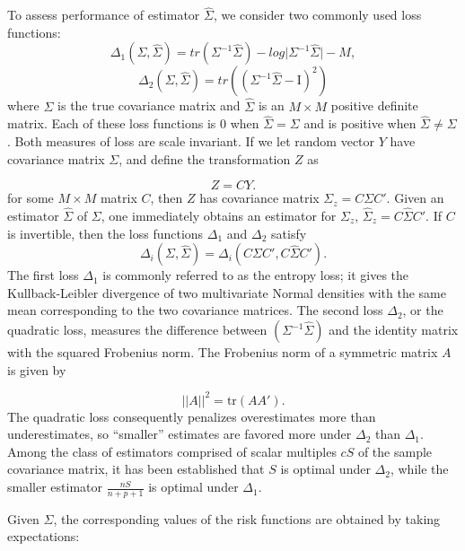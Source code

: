 \documentclass[12pt]{article}
\theoremstyle{definition}
\begin{document}
To assess performance of estimator $\hat{\Sigma}$, we consider two commonly used loss functions:
\begin{equation} \label{eq:quad-loss}
\Delta_1\left(\Sigma,\hat{\Sigma} \right) = tr\left( \Sigma^{-1} \hat{\Sigma} \right) - log \vert \Sigma^{-1} \hat{\Sigma} \vert - M,
\end{equation}
\noindent
\begin{equation} \label{eq:entropy-loss}
\Delta_2\left(\Sigma,\hat{\Sigma}\right) = tr\left(\left( \Sigma^{-1} \hat{\Sigma} - \mathrm{I}\right)^2 \right)
\end{equation}
\noindent
where $\Sigma$ is the true covariance matrix and $\hat{\Sigma}$ is an $M \times M$ positive definite matrix. Each of these loss functions is $0$ when $\hat{\Sigma} = \Sigma$ and is positive when $\hat{\Sigma} \ne \Sigma$. Both measures of loss are scale invariant. If we let random vector $Y$ have covariance matrix $\Sigma$, and define the transformation $Z$ as

\[
Z = CY. 
\]
\noindent
for some $M \times M$ matrix $C$,  then $Z$ has covariance matrix $\Sigma_z = C \Sigma C'$. Given an estimator $\hat{\Sigma}$ of $\Sigma$, one immediately obtains an estimator for $\Sigma_z$, $\hat{\Sigma}_z = C \hat{\Sigma} C'$. If $C$ is invertible, then the loss functions $\Delta_1$ and $\Delta_2$ satisfy
\[
\Delta_i\left(\Sigma,\hat{\Sigma}\right) = \Delta_i\left(C \Sigma C', C \hat{\Sigma}C' \right). 
\]
\noindent
The first loss $\Delta_1$ is commonly referred to as the entropy loss; it gives the Kullback-Leibler divergence of two multivariate Normal densities with the same mean corresponding to the two covariance matrices. The second loss $\Delta_2$, or the quadratic loss, measures the difference between $\left(\Sigma^{-1} \hat{\Sigma}\right)$ and the identity matrix with the squared Frobenius norm. The Frobenius norm of a symmetric matrix $A$ is given by 

\[
\vert \vert A \vert \vert^2 = \mbox{tr}\left(A A'\right).
\]
\noindent
The quadratic loss consequently penalizes overestimates more than underestimates, so ``smaller'' estimates are favored more under $\Delta_2$ than $\Delta_1$. Among the class of estimators comprised of scalar multiples $cS$ of the sample covariance matrix, it has been established \citet{haff1980empirical} that $S$ is optimal under $\Delta_2$, while the smaller estimator $\frac{nS}{n+p+1}$ is optimal under $\Delta_1$. 
\bigskip

Given $\Sigma$, the corresponding values of the risk functions are obtained by taking expectations:
\end{document}
